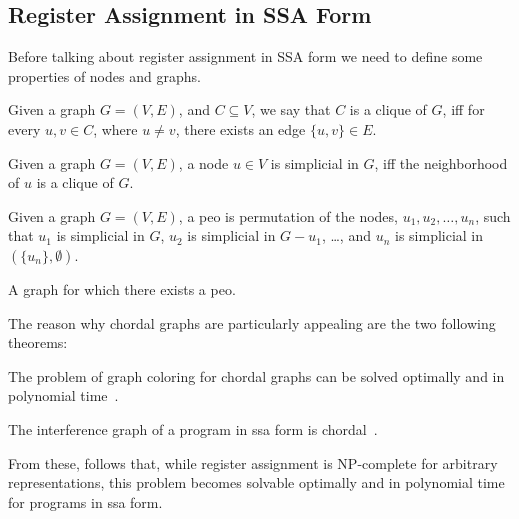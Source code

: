 \subsection{Register Assignment in SSA Form}
\label{subsec:ssara}

Before talking about register assignment in SSA form we need to define some properties of nodes and graphs.

\begin{definition}[Clique]\label{def:clique}
  Given a graph $G = (V, E)$, and $C \subseteq V$, we say that $C$ is a clique of $G$, iff for every $u, v \in C$, where $u \neq v$, there exists an edge $\{ u, v \} \in E$.
\end{definition}

\begin{definition}\label{def:simplicial}
  Given a graph $G = (V, E)$, a node $u \in V$ is simplicial in $G$, iff the neighborhood of $u$ is a clique of $G$.
\end{definition}

\begin{definition}\label{def:peo}
  Given a graph $G = (V, E)$, a \gls{peo} is permutation of the nodes, $u_1, u_2, \dots, u_n$, such that $u_1$ is simplicial in $G$, $u_2$ is simplicial in $G - u_1$, \dots, and $u_n$ is simplicial in $(\{ u_n \}, \emptyset)$.
\end{definition}

\begin{definition}\label{def:chordal1}
  A graph for which there exists a \gls{peo}.
\end{definition}

The reason why chordal graphs are particularly appealing are the two following theorems:

\begin{theorem}
  The problem of graph coloring for chordal graphs can be solved optimally and in polynomial time~\cite{golumbic2004algorithmic}.
\end{theorem}

\begin{theorem}
  The interference graph of a program in \gls{ssa} form is chordal~\cite{HGG:2006:RA-SSA}.
\end{theorem}

From these, follows that, while register assignment is NP-complete for arbitrary representations, this problem becomes solvable optimally and in polynomial time for programs in \gls{ssa} form.

